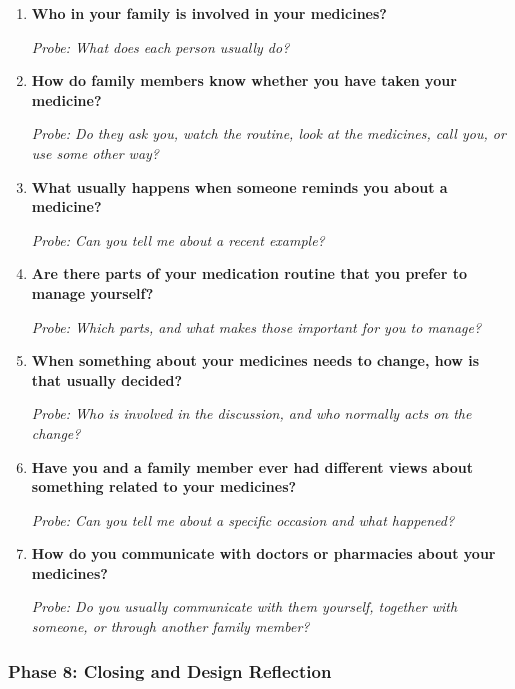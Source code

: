 \begin{enumerate}[resume]
  \item \textbf{Who in your family is involved in your medicines?}

  \textit{Probe: What does each person usually do?}
  \item \textbf{How do family members know whether you have taken your medicine?}

  \textit{Probe: Do they ask you, watch the routine, look at the medicines, call you, or use some other way?}
  \item \textbf{What usually happens when someone reminds you about a medicine?}

  \textit{Probe: Can you tell me about a recent example?}
  \item \textbf{Are there parts of your medication routine that you prefer to manage yourself?}

  \textit{Probe: Which parts, and what makes those important for you to manage?}
  \item \textbf{When something about your medicines needs to change, how is that usually decided?}

  \textit{Probe: Who is involved in the discussion, and who normally acts on the change?}
  \item \textbf{Have you and a family member ever had different views about something related to your medicines?}

  \textit{Probe: Can you tell me about a specific occasion and what happened?}
  \item \textbf{How do you communicate with doctors or pharmacies about your medicines?}

  \textit{Probe: Do you usually communicate with them yourself, together with someone, or through another family member?}
\end{enumerate}

\subsubsection{Phase 8: Closing and Design Reflection}

